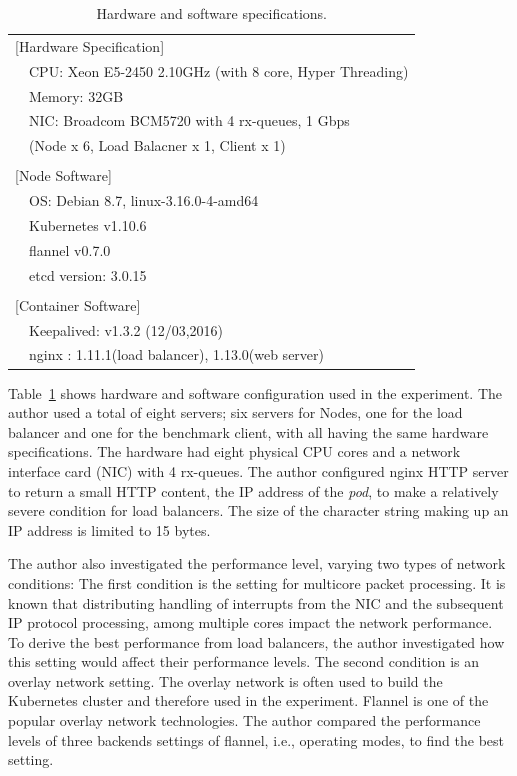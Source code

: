 {
\setlength{\tabcolsep}{3em}
\renewcommand{\arraystretch}{1.1}

\begin{table}[h]
  \centering
  \begin{tabular}{ll}
    \hline 
    \multicolumn{2}{l}{[Hardware Specification]}   \\
    & CPU: Xeon E5-2450 2.10GHz (with 8 core, Hyper Threading) \\
    & Memory: 32GB \\
    & NIC: Broadcom BCM5720 with 4 rx-queues, 1 Gbps \\
    & (Node x 6, Load Balacner x 1, Client x 1) \\
    & \\
    \multicolumn{2}{l}{[Node Software]}  \\
    & OS: Debian 8.7, linux-3.16.0-4-amd64 \\
    & Kubernetes v1.10.6 \\
    & flannel v0.7.0 \\
    & etcd version: 3.0.15 \\
    & \\
    \multicolumn{2}{l}{[Container Software]}   \\
    & Keepalived: v1.3.2 (12/03,2016) \\
    & nginx : 1.11.1(load balancer), 1.13.0(web server) \\
    \hline
  \end{tabular}
  \caption[Hardware and software specifications]{Hardware and software specifications.}
    \label{tab:hw_machine_spec}
\end{table}
}

Table~\ref{tab:hw_machine_spec} shows hardware and software configuration used in the experiment.
The author used a total of eight servers; six servers for Nodes, one for the load balancer and one for the benchmark client, with all having the same hardware specifications.
The hardware had eight physical CPU cores and a network interface card (NIC) with 4 rx-queues.
The author configured nginx HTTP server to return a small HTTP content, the IP address of the {\em pod}, to make a relatively severe condition for load balancers. 
The size of the character string making up an IP address is limited to 15 bytes.

The author also investigated the performance level, varying two types of network conditions:
The first condition is the setting for multicore packet processing.
It is known that distributing handling of interrupts from the NIC and the subsequent IP protocol processing, among multiple cores impact the network performance.
To derive the best performance from load balancers, the author investigated how this setting would affect their performance levels.
The second condition is an overlay network setting\cite{Sill2016,Marmol2015}.
The overlay network is often used to build the Kubernetes cluster and therefore used in the experiment.
Flannel\cite{CoreOSFlannel} is one of the popular overlay network technologies. 
The author compared the performance levels of three backends settings\cite{CoreOSFlannelBackend} of flannel, i.e., operating modes, to find the best setting.

